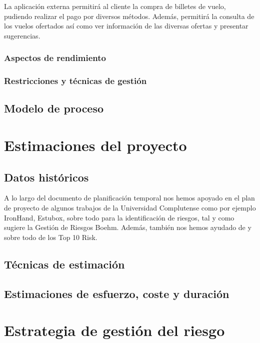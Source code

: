 \documentclass[11pt, a4paper, twoside]{report}
\begin{document}
			La aplicación externa permitirá al cliente la compra de billetes de vuelo, pudiendo realizar el pago por diversos métodos. Además, permitirá la consulta de los vuelos ofertados así como ver información de las diversas ofertas y presentar sugerencias.

			\subsubsection{Aspectos de rendimiento}
			\subsubsection{Restricciones y técnicas de gestión}
		\subsection{Modelo de proceso}
	\section{Estimaciones del proyecto}
		\subsection{Datos históricos}
	A lo largo del documento de planificación temporal nos hemos apoyado en el plan de proyecto de algunos trabajos de la Universidad Complutense como por ejemplo IronHand, Estubox, sobre todo para la identificación de riesgos, tal y como sugiere la Gestión de Riesgos Boehm. Además, también nos hemos ayudado de \cite{PSMAN} y sobre todo de los Top 10 Risk.
		\subsection{Técnicas de estimación}
		
		\subsection{Estimaciones de esfuerzo, coste y duración}
	\section{Estrategia de gestión del riesgo}
\end{document}
